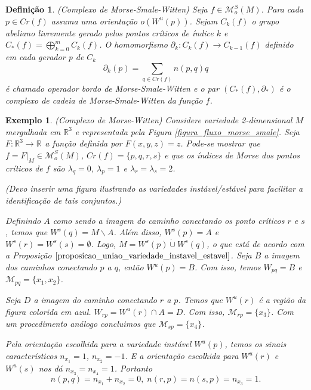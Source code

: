 \documentclass[12pt]{book}
\newtheorem{definicao}[teorema]{Definição}
\newtheorem{exemplo}[teorema]{Exemplo}
\newcommand{\complementar}[2]{#1 \backslash #2}
\newcommand{\espacomoduli}[2]{\mathcal{M}_{#1#2}}
\newcommand{\funcoesmorsesmale}[1]{\mathcal{M}^{S}_{o}(#1)}
\newcommand{\pontoscriticos}[1]{\textit{Cr}(#1)}
\newcommand{\real}[1]{\mathbb{R}^{#1}}
\newcommand{\reta}{\real{}}
\newcommand{\variedadeconectantepontos}[2]{W_{#1#2}}
\newcommand{\variedadeestavel}[1]{W^{s}(#1)}
\newcommand{\variedadeinstavel}[1]{W^{u}(#1)}
\newcommand{\vermelho}[1]{{\color{red}#1}}
\begin{document}
	\begin{definicao}
		(Complexo de Morse-Smale-Witten) Seja $f \in \funcoesmorsesmale{M}$. Para cada $p \in \pontoscriticos{f}$ assuma uma orientação $o(\variedadeinstavel{p})$. Sejam $C_{k}(f)$ o grupo abeliano livremente gerado pelos pontos críticos de índice $k$ e $C_{*}(f) =\bigoplus^{m}_{k=0}C_{k}(f)$. O homomorfismo $\partial_{k}: C_{k}(f)\to C_{k-1}(f)$ definido em cada gerador p de $C_{k}$
		$$
		\partial_{k}(p)=\sum_{q \in \pontoscriticos{f}}n(p,q)q
		$$
		é chamado operador bordo de Morse-Smale-Witten e o par $(C_{*}(f), \partial_{*})$ é o complexo de cadeia de Morse-Smale-Witten  da função $f$.
		
	\end{definicao}
	
	\begin{exemplo}
		(Complexo de Morse-Witten) Considere variedade 2-dimensional $M$ mergulhada em $\real{3}$ e representada pela Figura \ref{figura_fluxo_morse_smale}. Seja $F:\real{3} \to \reta$ a função definida por $F(x, y, z) = z$. Pode-se mostrar que $f=F|_{M} \in \funcoesmorsesmale{M}$,  $\pontoscriticos{f} = \{p,q,r,s\}$ e que os índices de Morse dos pontos críticos de $f$ são $\lambda_{q} = 0$, $\lambda_{p} = 1$ e $\lambda_{r}=\lambda_{s} = 2$. 
		
		\vermelho{(Devo inserir uma figura ilustrando as variedades instável/estável para facilitar a identificação de tais conjuntos.)}
		
		Definindo $A$ como sendo a imagem do caminho conectando os ponto críticos $r$ e $s$, temos que $\variedadeestavel{q} = \complementar{M}{A}$. Além disso, $\variedadeestavel{p} = A$ e $\variedadeestavel{r} = \variedadeestavel{s} = \emptyset$. Logo, $M = \variedadeestavel{p}\dot{\cup} \variedadeestavel{q}$, o que está de acordo com a Proposição $\ref{proposicao_uniao_variedade_instavel_estavel}$. Seja $B$ a imagem dos caminhos conectando $p$ a $q$, então $\variedadeinstavel{p} = B$. Com isso, temos $\variedadeconectantepontos{p}{q} = B$ e $\espacomoduli{p}{q}=\{x_{1}, x_{2}\}$. 
		
		Seja $D$ a imagem do caminho conectando $r$ a $p$. Temos que $\variedadeinstavel{r}$ é a região da figura colorida em azul. $\variedadeconectantepontos{r}{p} = \variedadeinstavel{r} \cap A = D$. Com isso, $\espacomoduli{r}{p} = \{ x_{3}\}$. Com um procedimento análogo concluimos que $\espacomoduli{s}{p} = \{x_{4} \}$.
		
		Pela orientação escolhida para a variedade instável $\variedadeinstavel{p}$, temos os sinais característicos $n_{x_{1}}=1$, $n_{x_{2}} = -1$. E a orientação escolhida para $\variedadeinstavel{r}$ e $\variedadeinstavel{s}$ nos dá $n_{x_{3}} =n_{x_{4}}= 1$. Portanto 
		$$
		n(p,q) = n_{x_{1}}+n_{x_{2}} = 0,\; n(r,p) = n(s,p)=n_{x_{3}}= 1. 
		$$
		

\end{exemplo}
\end{document}
